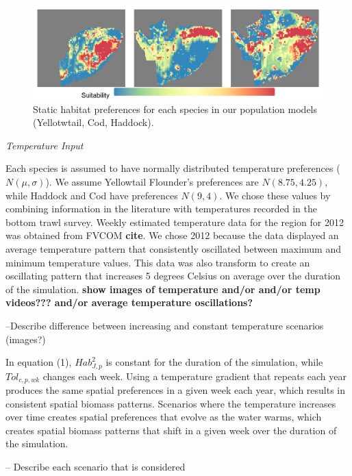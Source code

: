 \documentclass[
  12pt,
]{article}
\begin{document}
\begin{figure}

{\centering \includegraphics[width=0.95\linewidth]{Images/Habitat_3species} 

}

\caption{Static habitat preferences for each species in our population models (Yellotwtail, Cod, Haddock).}\label{fig:hab-plot}
\end{figure}

\emph{Temperature Input}

Each species is assumed to have normally distributed temperature preferences (\(N(\mu,\sigma)\)). We assume Yellowtail Flounder's preferences are \(N(8.75,4.25)\), while Haddock and Cod have preferences \(N(9,4)\). We chose these values by combining information in the literature with temperatures recorded in the bottom trawl survey. Weekly estimated temperature data for the region for 2012 was obtained from FVCOM \textbf{cite}. We chose 2012 because the data displayed an average temperature pattern that consistently oscillated between maximum and minimum temperature values. This data was also transform to create an oscillating pattern that increases 5 degrees Celsius on average over the duration of the simulation. \textbf{show images of temperature and/or and/or temp videos??? and/or average temperature oscillations?}

--Describe difference between increasing and constant temperature scenarios (images?)

In equation (1), \(Hab^2_{J,p}\) is constant for the duration of the simulation, while \(Tol_{c,p,wk}\) changes each week. Using a temperature gradient that repeats each year produces the same spatial preferences in a given week each year, which results in consistent spatial biomass patterns. Scenarios where the temperature increases over time creates spatial preferences that evolve as the water warms, which creates spatial biomass patterns that shift in a given week over the duration of the simulation.

-- Describe each scenario that is considered
\end{document}
